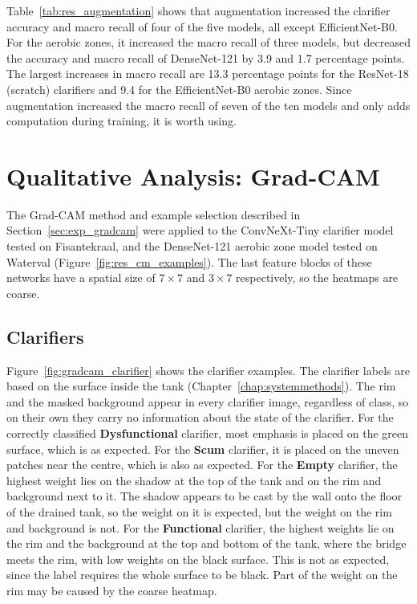 Table~\ref{tab:res_augmentation} shows that augmentation increased the clarifier accuracy and macro recall of four of the five models, all except EfficientNet-B0. For the aerobic zones, it increased the macro recall of three models, but decreased the accuracy and macro recall of DenseNet-121 by 3.9 and 1.7 percentage points. The largest increases in macro recall are 13.3 percentage points for the ResNet-18 (scratch) clarifiers and 9.4 for the EfficientNet-B0 aerobic zones. Since augmentation increased the macro recall of seven of the ten models and only adds computation during training, it is worth using.

\FloatBarrier


\section{Qualitative Analysis: Grad-CAM}
\label{sec:results_gradcam}

The Grad-CAM method and example selection described in Section~\ref{sec:exp_gradcam} were applied to the ConvNeXt-Tiny clarifier model tested on Fisantekraal, and the DenseNet-121 aerobic zone model tested on Waterval (Figure~\ref{fig:res_cm_examples}). The last feature blocks of these networks have a spatial size of $7\times7$ and $3\times7$ respectively, so the heatmaps are coarse.

\subsection{Clarifiers}
\label{sec:results_gradcam_clarifiers}

Figure~\ref{fig:gradcam_clarifier} shows the clarifier examples. The clarifier labels are based on the surface inside the tank (Chapter~\ref{chap:systemmethods}). The rim and the masked background appear in every clarifier image, regardless of class, so on their own they carry no information about the state of the clarifier. For the correctly classified \textbf{Dysfunctional} clarifier, most emphasis is placed on the green surface, which is as expected. For the \textbf{Scum} clarifier, it is placed on the uneven patches near the centre, which is also as expected. For the \textbf{Empty} clarifier, the highest weight lies on the shadow at the top of the tank and on the rim and background next to it. The shadow appears to be cast by the wall onto the floor of the drained tank, so the weight on it is expected, but the weight on the rim and background is not. For the \textbf{Functional} clarifier, the highest weights lie on the rim and the background at the top and bottom of the tank, where the bridge meets the rim, with low weights on the black surface. This is not as expected, since the label requires the whole surface to be black. Part of the weight on the rim may be caused by the coarse heatmap.

